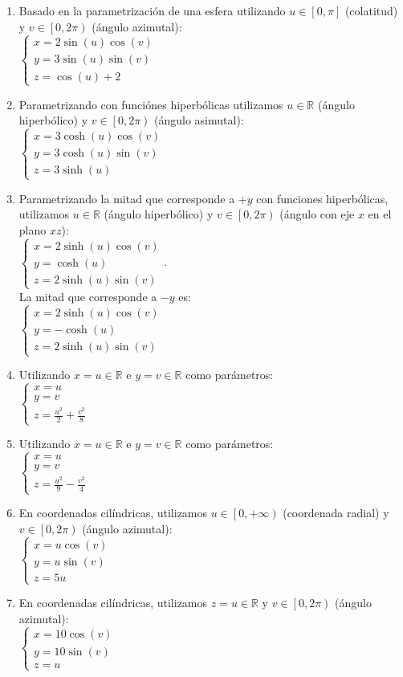 \documentclass[a4paper]{article}
\newcommand{\SEL}[1]{ \left\{\begin{matrix} #1 \end{matrix}\right. }
\newcommand{\df}[2]{\displaystyle\frac{#1}{#2}}
\begin{document}
\begin{enumerate}
\begin{enumerate} [label=(\alph*)]
		\item Basado en la parametrización de una esfera utilizando $u \in \left[0,\pi\right]$ (colatitud) y $v \in \left[0,2\pi\right)$ (ángulo azimutal): \\ $\SEL{x=2\sin(u)\cos(v) \\ y=3\sin(u)\sin(v) \\ z= \cos(u)+2}$
		\item Parametrizando con funciónes hiperbólicas utilizamos $u \in \mathbb{R}$ (ángulo hiperbólico) y $v \in \left[0,2\pi\right)$ (ángulo asimutal): \\ $\SEL{x=3\cosh(u)\cos(v) \\ y=3\cosh(u)\sin(v) \\ z=3\sinh(u)}$
		\item Parametrizando la mitad que corresponde a $+y$ con funciones hiperbólicas, utilizamos $u \in \mathbb{R}$ (ángulo hiperbólico) y $v \in \left[0,2\pi\right)$ (ángulo con eje $x$ en el plano $xz$): \\ $\SEL{x=2\sinh(u)\cos(v) \\ y=\cosh(u) \\ z=2\sinh(u)\sin(v)}$. \\ La mitad que corresponde a $-y$ es: \\ $\SEL{x=2\sinh(u)\cos(v) \\ y=-\cosh(u) \\ z=2\sinh(u)\sin(v)}$
		\item Utilizando $x=u \in \mathbb{R}$ e $y=v\in \mathbb{R}$ como parámetros: \\ $\SEL{x=u \\ y=v \\ z=\df{u^2}{2}+\df{v^2}{8}}$
		\item Utilizando $x=u \in \mathbb{R}$ e $y=v\in \mathbb{R}$ como parámetros: \\ $\SEL{x=u \\ y=v \\ z=\df{u^2}{9}-\df{v^2}{4}}$
		\item En coordenadas cilíndricas, utilizamos $u \in \left[0,+\infty\right)$ (coordenada radial) y $v \in \left[0,2\pi\right)$ (ángulo azimutal): \\ $\SEL{x=u\cos(v) \\ y=u \sin(v) \\ z=5u}$
		\item En coordenadas cilíndricas, utilizamos $z=u \in \mathbb{R}$ y $v \in \left[0,2\pi\right)$ (ángulo azimutal): \\ $\SEL{x=10\cos(v) \\ y=10 \sin(v) \\ z=u}$
\end{enumerate}\end{enumerate}
\end{document}
